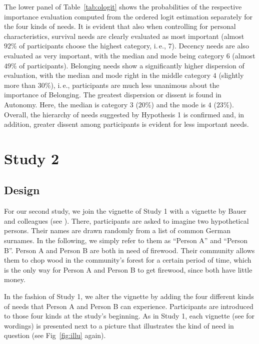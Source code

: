 \documentclass[10pt,letterpaper]{article}
\begin{document}
The lower panel of Table~\ref{tab:ologit} shows the probabilities of the respective importance evaluation computed from the ordered logit estimation separately for the four kinds of needs.
It is evident that also when controlling for personal characteristics, survival needs are clearly evaluated as most important (almost $92\%$ of participants choose the highest category, i.\,e., $7$).
Decency needs are also evaluated as very important, with the median and mode being category $6$ (almost $49\%$ of participants).
Belonging needs show a significantly higher dispersion of evaluation, with the median and mode right in the middle category $4$ (slightly more than $30\%$), i.\,e., participants are much less unanimous about the importance of Belonging.
The greatest dispersion or dissent is found in Autonomy.
Here, the median is category $3$ ($20\%$) and the mode is $4$ ($23\%$).
Overall, the hierarchy of needs suggested by Hypothesis 1 is confirmed and, in addition, greater dissent among participants is evident for less important needs.


\section*{Study 2}\label{sec:study_2}


\subsection*{Design}
For our second study, we join the vignette of Study 1 with a vignette by Bauer and colleagues (see \cite{bauer_need_2022}).
There, participants are asked to imagine two hypothetical persons.
Their names are drawn randomly from a list of common German surnames.
In the following, we simply refer to them as ``Person A'' and ``Person B''.
Person A and Person B are both in need of firewood.
Their community allows them to chop wood in the community's forest for a certain period of time, which is the only way for Person A and Person B to get firewood, since both have little money.

In the fashion of Study 1, we alter the vignette by adding the four different kinds of needs that Person A and Person B can experience.
Participants are introduced to those four kinds at the study's beginning.
As in Study 1, each vignette (see  for wordings) is presented next to a picture that illustrates the kind of need in question (see Fig~\ref{fig:illu} again).
\end{document}
